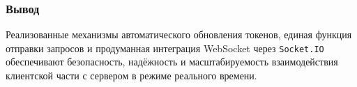 \subsubsection*{Вывод}

Реализованные механизмы автоматического обновления токенов, единая функция отправки запросов и продуманная интеграция WebSocket через \texttt{Socket.IO} обеспечивают безопасность, надёжность и масштабируемость взаимодействия клиентской части с сервером в режиме реального времени.
